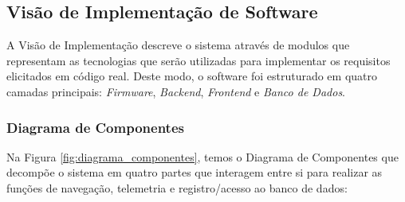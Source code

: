 \subsection{Visão de Implementação de Software} 

    A Visão de Implementação descreve o sistema através de modulos que representam as tecnologias que serão utilizadas para implementar os requisitos elicitados em código real. Deste modo, o software foi estruturado em quatro camadas principais: \textit{Firmware}, \textit{Backend}, \textit{Frontend} e \textit{Banco de Dados}.

\subsubsection{Diagrama de Componentes} 

Na Figura \ref{fig:diagrama_componentes}, temos o Diagrama de Componentes que decompõe o sistema em quatro partes que interagem entre si para realizar as funções de navegação, telemetria e registro/acesso ao banco de dados:

